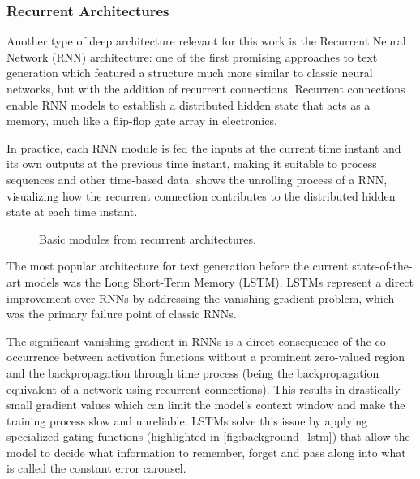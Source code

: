 \subsubsection*{Recurrent Architectures}

Another type of deep architecture relevant for this work is the Recurrent Neural Network (RNN) architecture: one of the first promising approaches to text generation which featured a structure much more similar to classic neural networks, but with the addition of recurrent connections.
Recurrent connections enable RNN models to establish a distributed hidden state that acts as a memory, much like a flip-flop gate array in electronics.

In practice, each RNN module is fed the inputs at the current time instant and its own outputs at the previous time instant, making it suitable to process sequences and other time-based data.
 shows the unrolling process of a RNN, visualizing how the recurrent connection contributes to the distributed hidden state at each time instant.

\begin{figure}[t!]
    \centering
    \quad
    \caption{Basic modules from recurrent architectures.}
    \label{fig:background_rnn_lstm}
\end{figure}

The most popular architecture for text generation before the current state-of-the-art models was the Long Short-Term Memory (LSTM).
LSTMs represent a direct improvement over RNNs by addressing the vanishing gradient problem, which was the primary failure point of classic RNNs.

The significant vanishing gradient in RNNs is a direct consequence of the co-occurrence between activation functions without a prominent zero-valued region and the backpropagation through time process (being the backpropagation equivalent of a network using recurrent connections).
This results in drastically small gradient values which can limit the model's context window and make the training process slow and unreliable.
LSTMs solve this issue by applying specialized gating functions (highlighted in \cref{fig:background_lstm}) that allow the model to decide what information to remember, forget and pass along into what is called the constant error carousel.

